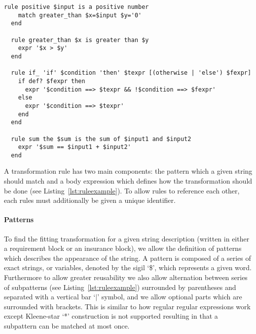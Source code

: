 \begin{lstlisting}[caption={Different Types of Transformation Rules in Lettuce},label={lst:ruleexample}]
  rule positive $input is a positive number
    match greater_than $x=$input $y='0'
  end

  rule greater_than $x is greater than $y
    expr '$x > $y'
  end

  rule if_ 'if' $condition 'then' $texpr [(otherwise | 'else') $fexpr]
    if def? $fexpr then
      expr '$condition ==> $texpr && !$condition ==> $fexpr'
    else
      expr '$condition ==> $texpr'
    end
  end

  rule sum the $sum is the sum of $input1 and $input2
    expr '$sum == $input1 + $input2'
  end
\end{lstlisting}

A transformation rule has two main components: the pattern which a given
string should match and a body expression which defines how the
transformation should be done (see Listing~\ref{lst:ruleexample}).
To allow rules to reference each other, each rules must additionally be
given a unique identifier.

\paragraph{Patterns}
\label{par:Patterns}

To find the fitting transformation for a given string description
(written in either a requirement block or an insurance block), we allow the
definition of patterns which describes the appearance of the string.
A pattern is composed of a series of exact strings, or variables,
denoted by the sigil `\$', which represents a given word.
Furthermore to allow greater reusability we also allow alternation between
series of subpatterns (see Listing~\ref{lst:ruleexample}) surrounded by parentheses and
separated with a vertical bar `$\vert$' symbol, and we allow optional parts which are
surrounded with brackets.  This is similar to how regular regular
expressions work except Kleene-star `*' construction is not supported
resulting in that a subpattern can be matched at most once.

